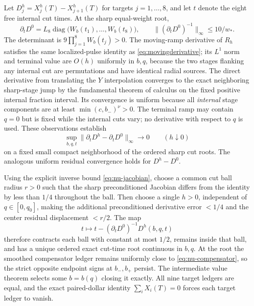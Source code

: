 \documentclass[review,hidelinks,onefignum,onetabnum]{siamonline250211}%
\begin{document}
Let $D_j^h=X_j^h(T)-X_{j+1}^h(T)$ for targets
$j=1,\ldots,8$, and let $t$ denote the eight free
internal cut times. At the sharp equal-weight root,
\begin{equation}\label{eq:nu-jacobian}
 \partial_t D^0= L_8\operatorname{diag}
       \bigl(W_b(t_1),\ldots,W_b(t_8)\bigr),\qquad
 \| (\partial_t D^0)^{-1}\|_\infty\le 10/w_*.
\end{equation}
The determinant is $9\prod_{j=1}^8W_b(t_j)>0$.
The moving-ramp derivative of $R_h$ satisfies the same
localized-pulse identity as \eqref{eq:movingderivative};
its $L^1$ norm and terminal value are $O(h)$ uniformly in
$b,q$, because the two stages flanking any internal cut are
permutations and have identical radial sources.
The direct derivative from translating the $Y$ interpolation
converges to the exact neighboring sharp-stage jump by the
fundamental theorem of calculus on the fixed positive
internal fraction interval. Its convergence is uniform because
all \emph{internal} stage components are at least
$\min(c,b_-)^\nu>0$. The terminal ramp may contain
$q=0$ but is fixed while the internal cuts vary; no derivative
with respect to $q$ is used. These observations establish
\[
 \sup_{b,q,t}\|\partial_tD^h-\partial_tD^0\|_\infty
 \longrightarrow0\qquad(h\downarrow0)
\]
on a fixed small compact neighborhood of the ordered
sharp cut roots. The analogous uniform residual convergence
holds for $D^h-D^0$.

Using the explicit inverse bound \eqref{eq:nu-jacobian},
choose a common cut ball radius $r>0$ such that the sharp
preconditioned Jacobian differs from the identity by less
than $1/4$ throughout the ball. Then choose a single
$h>0$, independent of $q\in[0,q_0]$, making the additional
preconditioned derivative error $<1/4$ and the center
residual displacement $<r/2$. The map
\[
 t\longmapsto t-(\partial_tD^0)^{-1}D^h(b,q,t)
\]
therefore contracts each ball with constant at most $1/2$,
remains inside that ball, and has a unique ordered exact
cut-time root continuous in $b,q$. At the root the smoothed
compensator ledger remains uniformly close to
\eqref{eq:nu-compensator}, so the strict opposite endpoint
signs at $b_-,b_+$ persist. The intermediate value theorem
selects some $b=b(q)$ closing it exactly. All nine target
ledgers are equal, and the exact paired-dollar identity
$\sum_i X_i(T)=0$ forces each target ledger to vanish.
\end{document}
